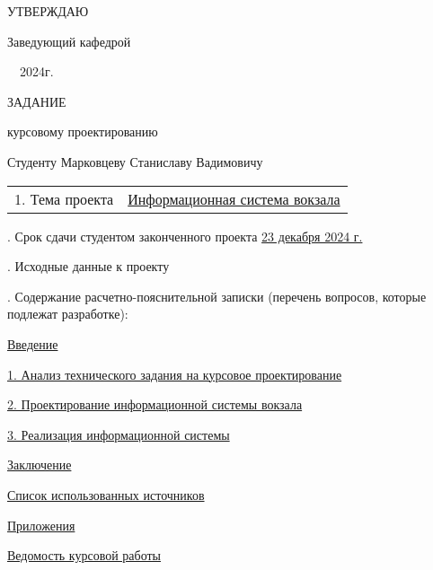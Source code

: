 
\setcounter{page}{2}
% 
\hfill\begin{minipage}{\widthof{Заведующий кафедрой}}


  УТВЕРЖДАЮ

  Заведующий кафедрой


  \underline{\hphantom{хорошая дата }}\ \  2024г.

\end{minipage}
\medskip

\begin{center}
  \noindent
  ЗАДАНИЕ

   курсовому проектированию

  \bigskip
  \noindent Студенту Марковцеву Станиславу Вадимовичу
\end{center}

\noindent
\begin{tabular*}{\linewidth}{@{}ll@{}}
  1. Тема проекта                              & \uline{Информационная система вокзала}
\end{tabular*}

\smallskip
{}. Срок сдачи студентом законченного проекта \uline{\hfill 23 декабря 2024 г. \hfill}

\smallskip
{}. Исходные данные к проекту \uline{\hfill}

\smallskip
{}. Содержание расчетно-пояснительной записки (перечень вопросов, которые подлежат разработке):
\begin{description}
  \item \uline{Введение} 
  \item \uline{1. Анализ технического задания на курсовое проектирование}
  \item \uline{2. Проектирование информационной системы вокзала}
  \item \uline{3. Реализация информационной системы}
  \item \uline{Заключение}
  \item \uline{Список использованных источников}
  \item \uline{Приложения}
  \item \uline{Ведомость курсовой работы}
\end{description}

